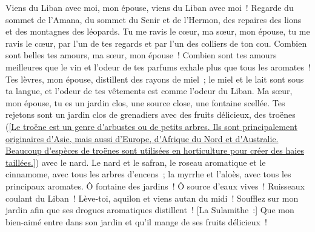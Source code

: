 \begin{multicols}{2}
Viens du Liban avec moi, mon épouse, viens du Liban avec moi~! Regarde du sommet de l'Amana, du sommet du Senir et de l'Hermon, des repaires des lions et des montagnes des léopards.
Tu me ravis le cœur, ma sœur, mon épouse, tu me ravis le cœur, par l'un de tes regards et par l'un des colliers de ton cou.
Combien sont belles tes amours, ma sœur, mon épouse~! Combien sont tes amours meilleures que le vin et l'odeur de tes parfums exhale plus que tous les aromates~!
Tes lèvres, mon épouse, distillent des rayons de miel~; le miel et le lait sont sous ta langue, et l'odeur de tes vêtements est comme l'odeur du Liban.
Ma sœur, mon épouse, tu es un jardin clos, une source close, une fontaine scellée.
Tes rejetons sont un jardin clos de grenadiers avec des fruits délicieux, des troënes (\vref{Le troëne est un genre d'arbustes ou de petits arbres. Ils sont principalement originaires d'Asie, mais aussi d’Europe, d'Afrique du Nord et d'Australie. Beaucoup d'espèces de troënes sont utilisées en horticulture pour créer des haies taillées.}) avec le nard.
Le nard et le safran, le roseau aromatique et le cinnamome, avec tous les arbres d'encens~; la myrrhe et l'aloès, avec tous les principaux aromates.
Ô fontaine des jardins~! Ô source d'eaux vives~! Ruisseaux coulant du Liban~!
Lève-toi, aquilon et viens autan du midi~! Soufflez sur mon jardin afin que ses drogues aromatiques distillent~! [La Sulamithe~:] Que mon bien-aimé entre dans son jardin et qu'il mange de ses fruits délicieux~!

\end{multicols}
